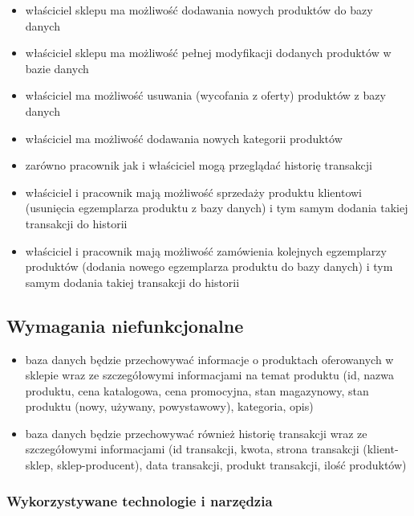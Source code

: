 \begin{itemize}
	\item właściciel sklepu ma możliwość dodawania nowych produktów do bazy danych
	
	\item właściciel sklepu ma możliwość pełnej modyfikacji dodanych produktów w bazie danych
	
	\item właściciel ma możliwość usuwania (wycofania z oferty) produktów z bazy danych
	
	\item właściciel ma możliwość dodawania nowych kategorii produktów
	
	\item zarówno pracownik jak i właściciel mogą przeglądać historię transakcji
	
	\item właściciel i pracownik mają możliwość sprzedaży produktu klientowi (usunięcia egzemplarza produktu z bazy danych) i tym samym dodania takiej transakcji do historii
	
	\item właściciel i pracownik mają możliwość zamówienia kolejnych egzemplarzy produktów (dodania nowego egzemplarza produktu do bazy danych) i tym samym dodania takiej transakcji do historii
\end{itemize}

\subsection{Wymagania niefunkcjonalne}

\begin{itemize}
	\item baza danych będzie przechowywać informacje o produktach oferowanych w sklepie wraz ze szczegółowymi informacjami na temat produktu (id, nazwa produktu, cena katalogowa, cena promocyjna, stan magazynowy, stan produktu (nowy, używany, powystawowy), kategoria, opis)
	
	\item baza danych będzie przechowywać również historię transakcji wraz ze szczegółowymi informacjami (id transakcji, kwota, strona transakcji (klient-sklep, sklep-producent), data transakcji, produkt transakcji, ilość produktów)
\end{itemize}

\subsubsection{Wykorzystywane technologie i narzędzia}

